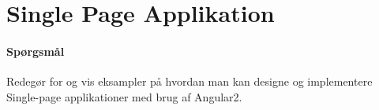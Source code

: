 \section{Single Page Applikation}

\paragraph{Spørgsmål}
Redegør for og vis eksampler på hvordan man kan designe og implementere Single-page applikationer med brug af Angular2.
